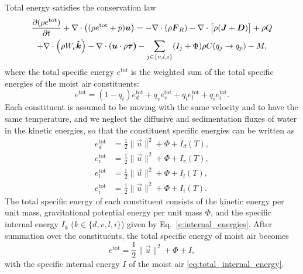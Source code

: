 \documentclass{report}
\begin{document}
Total energy satisfies the conservation law \citep{Romps08a,Bott08a}
\begin{multline}
 \diff{(\rho e^\mathrm{tot})}{t} + \divergence \left( (\rho e^\mathrm{tot} + p)\vec{u} \right)
 = -\divergence (\rho \vec{F}_R) - \divergence \bigl[\rho (\vec{J} + \vec{D})\bigr] + \rho Q  \\
  +\divergence \left(\rho W_c \vec{\hat k} \right)  - \divergence (\vec{u} \cdot \rho\vec{\tau)} %
   - \sum_{j\in\{v,l,i\}}(I_j + \Phi)  \rho C(q_j \rightarrow q_p) - M,
 \label{eq:energy_balance}
\end{multline}
where the total specific energy $e^{\mathrm{tot}}$ is the weighted sum of the total specific energies of the moist air constituents:
\begin{equation}\label{e:energy_sum}
    e^{\mathrm{tot}} = (1-q_t) e_d^{\mathrm{tot}} + q_v e_v^{\mathrm{tot}} + q_l e_l^{\mathrm{tot}} + q_i e_i^{\mathrm{tot}}.
\end{equation}
Each constituent is assumed to be moving with the same velocity and to have the same temperature, and we neglect the diffusive and sedimentation fluxes of water in the kinetic energies, so that the constituent specific energies can be written as
\begin{subequations}\label{e:constituent_energies}
\begin{align}
e_d^{\mathrm{tot}} & = \frac{1}{2} \| \vec{u} \|^2 + \Phi + I_d(T), \\
e_v^{\mathrm{tot}} & = \frac{1}{2} \| \vec{u} \|^2 + \Phi + I_v(T), \\
e_l^{\mathrm{tot}} & = \frac{1}{2} \| \vec{u} \|^2 + \Phi + I_l(T), \\
e_i^{\mathrm{tot}} & = \frac{1}{2} \| \vec{u} \|^2 + \Phi + I_i(T).
\end{align}
\end{subequations}
The total specific energy of each constituent consists of the kinetic energy per unit mass, gravitational potential energy per unit mass $\Phi$, and the specific internal energy $I_k$ ($k \in \{d, v, l, i\}$) given by Eq.~\eqref{e:internal_energies}. After summation over the constituents, the total specific energy of moist air becomes
\begin{equation}
     e^{\mathrm{tot}} = \frac{1}{2} \| \vec{u} \|^2 + \Phi + I,
     \label{eq:total_energy_def}
\end{equation}
with the specific internal energy $I$ of the moist air \eqref{eq:total_internal_energy}.
\end{document}
